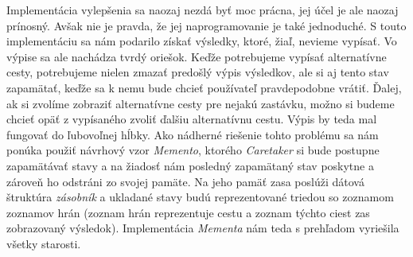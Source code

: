 Implementácia vylepšenia sa naozaj nezdá byť moc prácna, jej účel je ale naozaj prínosný. Avšak nie je pravda, že jej naprogramovanie je také jednoduché. S touto implementáciu sa nám podarilo získať výsledky, ktoré, žiaľ, nevieme vypísať. Vo výpise sa ale nachádza tvrdý oriešok. Keďže potrebujeme vypísať alternatívne cesty, potrebujeme nielen zmazať predošlý výpis výsledkov, ale si aj tento stav zapamätať, keďže sa k nemu bude chcieť používateľ pravdepodobne vrátiť. Ďalej, ak si zvolíme zobraziť alternatívne cesty pre nejakú zastávku, možno si budeme chcieť opäť z vypísaného zvoliť ďalšiu alternatívnu cestu. Výpis by teda mal fungovať do ľubovoľnej hĺbky. Ako nádherné riešenie tohto problému sa nám ponúka použiť návrhový vzor \textit{Memento}, ktorého \textit{Caretaker} si bude postupne zapamätávať stavy a na žiadosť nám posledný zapamätaný stav poskytne a zároveň ho odstráni zo svojej pamäte. Na jeho pamäť zasa poslúži dátová štruktúra \textit{zásobník} a ukladané stavy budú reprezentované triedou so zoznamom zoznamov hrán (zoznam hrán reprezentuje cestu a zoznam týchto ciest zas zobrazovaný výsledok). Implementácia \textit{Mementa} nám teda s prehľadom vyriešila všetky starosti.\newline

